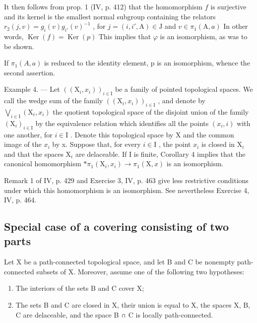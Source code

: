 It then follows from prop. 1 (IV, p. 412) that the homomorphism \(f\) is surjective and its kernel is the smallest normal subgroup containing the relators \(r_2(j,v) = g_i(v)g_{i'}(v)^{-1}\) , for \(j = (i,i',\mathrm{A}) \in \mathrm{J}\) and \(v \in \pi_1(\mathrm{A},a)\) In other words, \(\operatorname{Ker}(f) = \operatorname{Ker}(p)\) This implies that \(\varphi\) is an isomorphism, as was to be shown.

If \(\pi_{1}(A,a)\) is reduced to the identity element, p is an isomorphism, whence the second assertion.

Example 4. — Let \(((\mathrm{X}_{i}, x_{i}))_{i \in \mathrm{I}}\) be a family of pointed topological spaces. We call the wedge sum of the family \(((\mathrm{X}_{i}, x_{i}))_{i \in \mathrm{I}}\) , and denote by \(\bigvee_{i \in \mathrm{I}} (\mathrm{X}_{i}, x_{i})\) the quotient topological space of the disjoint union of the family \((\mathrm{X}_{i})_{i \in \mathrm{I}}\) by the equivalence relation which identifies all the points \((x_{i}, i)\) with one another, for \(i \in \mathrm{I}\) . Denote this topological space by X and the common image of the \(x_{i}\) by x. Suppose that, for every \(i \in \mathrm{I}\) , the point \(x_{i}\) is closed in \(\mathrm{X}_{i}\) and that the spaces \(\mathrm{X}_{i}\) are delaceable. If I is finite, Corollary 4 implies that the canonical homomorphism \(* \pi_{1}(\mathrm{X}_{i}, x_{i}) \to \pi_{1}(\mathrm{X}, x)\) is an isomorphism.

Remark 1 of IV, p. 429 and Exercise 3, IV, p. 463 give less restrictive conditions under which this homomorphism is an isomorphism. See nevertheless Exercise 4, IV, p. 464.

\subsection{Special case of a covering consisting of two parts}

Let X be a path-connected topological space, and let B and C be nonempty path-connected subsets of X. Moreover, assume one of the following two hypotheses:

\begin{enumerate}
\def\labelenumi{(\roman{enumi})}
\item
  The interiors of the sets B and C cover X;
\item
  The sets B and C are closed in X, their union is equal to X, the spaces X, B, C are delaceable, and the space B ∩ C is locally path-connected.
\end{enumerate}

